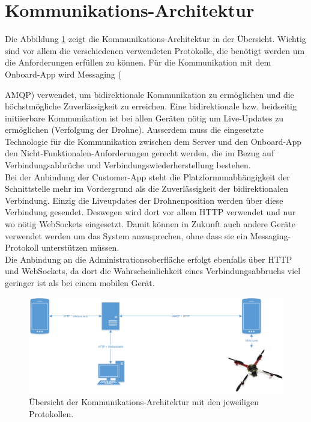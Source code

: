 {\section{Kommunikations-Architektur}
\label{sec:communication-architecture}
Die Abbildung \ref{fig:communication-architecture-overview} zeigt die Kommunikations-Architektur in der Übersicht. Wichtig sind vor allem die verschiedenen verwendeten Protokolle, die benötigt werden um die Anforderungen erfüllen zu können. Für die Kommunikation mit dem Onboard-App wird Messaging ({\Gls{AMQP}) verwendet, um bidirektionale Kommunikation zu ermöglichen und die höchstmögliche Zuverlässigkeit zu erreichen. Eine bidirektionale bzw. beidseitig initiierbare Kommunikation ist bei allen Geräten nötig um Live-Updates zu ermöglichen (Verfolgung der Drohne). Ausserdem muss die eingesetzte Technologie für die Kommunikation zwischen dem Server und den Onboard-App den Nicht-Funktionalen-Anforderungen gerecht werden, die im Bezug auf Verbindungsabbrüche und Verbindungswiederherstellung bestehen.\\
	
Bei der Anbindung der Customer-App steht die Platzformunabhängigkeit der Schnittstelle mehr im Vordergrund als die Zuverlässigkeit der bidirektionalen Verbindung. Einzig die Liveupdates der Drohnenposition werden über diese Verbindung gesendet. Deswegen wird dort vor allem HTTP verwendet und nur wo nötig WebSockets eingesetzt. Damit können in Zukunft auch andere Geräte verwendet werden um das System anzusprechen, ohne dass sie ein Messaging-Protokoll unterstützen müssen.\\

Die Anbindung an die Administrationsoberfläche erfolgt ebenfalls über HTTP und WebSockets, da dort die Wahrscheinlichkeit eines Verbindungsabbruchs viel geringer ist als bei einem mobilen Gerät.\\

\begin{figure}[H]
	\includegraphics[width=1.0\textwidth]{images/Communication-Overview-Diagram.png}
	\caption{Übersicht der Kommunikations-Architektur mit den jeweiligen Protokollen. }
	\label{fig:communication-architecture-overview}
\end{figure}

}}
